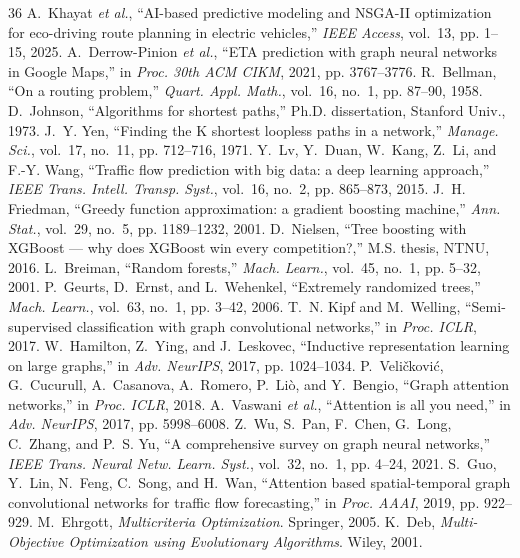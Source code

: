 \documentclass[journal]{IEEEtran}
\begin{document}
\begin{thebibliography}{36}
 A.~Khayat \emph{et al.}, ``AI-based predictive modeling and NSGA-II optimization for eco-driving route planning in electric vehicles,'' \emph{IEEE Access}, vol.~13, pp. 1--15, 2025.
 A.~Derrow-Pinion \emph{et al.}, ``ETA prediction with graph neural networks in Google Maps,'' in \emph{Proc. 30th ACM CIKM}, 2021, pp. 3767--3776.
 R.~Bellman, ``On a routing problem,'' \emph{Quart. Appl. Math.}, vol.~16, no.~1, pp. 87--90, 1958.
 D.~Johnson, ``Algorithms for shortest paths,'' Ph.D. dissertation, Stanford Univ., 1973.
 J.~Y. Yen, ``Finding the K shortest loopless paths in a network,'' \emph{Manage. Sci.}, vol.~17, no.~11, pp. 712--716, 1971.
 Y.~Lv, Y.~Duan, W.~Kang, Z.~Li, and F.-Y. Wang, ``Traffic flow prediction with big data: a deep learning approach,'' \emph{IEEE Trans. Intell. Transp. Syst.}, vol.~16, no.~2, pp. 865--873, 2015.
 J.~H. Friedman, ``Greedy function approximation: a gradient boosting machine,'' \emph{Ann. Stat.}, vol.~29, no.~5, pp. 1189--1232, 2001.
 D.~Nielsen, ``Tree boosting with XGBoost --- why does XGBoost win every competition?,'' M.S. thesis, NTNU, 2016.
 L.~Breiman, ``Random forests,'' \emph{Mach. Learn.}, vol.~45, no.~1, pp. 5--32, 2001.
 P.~Geurts, D.~Ernst, and L.~Wehenkel, ``Extremely randomized trees,'' \emph{Mach. Learn.}, vol.~63, no.~1, pp. 3--42, 2006.
 T.~N. Kipf and M.~Welling, ``Semi-supervised classification with graph convolutional networks,'' in \emph{Proc. ICLR}, 2017.
 W.~Hamilton, Z.~Ying, and J.~Leskovec, ``Inductive representation learning on large graphs,'' in \emph{Adv. NeurIPS}, 2017, pp. 1024--1034.
 P.~Veli\v{c}kovi\'{c}, G.~Cucurull, A.~Casanova, A.~Romero, P.~Li\`{o}, and Y.~Bengio, ``Graph attention networks,'' in \emph{Proc. ICLR}, 2018.
 A.~Vaswani \emph{et al.}, ``Attention is all you need,'' in \emph{Adv. NeurIPS}, 2017, pp. 5998--6008.
 Z.~Wu, S.~Pan, F.~Chen, G.~Long, C.~Zhang, and P.~S. Yu, ``A comprehensive survey on graph neural networks,'' \emph{IEEE Trans. Neural Netw. Learn. Syst.}, vol.~32, no.~1, pp. 4--24, 2021.
 S.~Guo, Y.~Lin, N.~Feng, C.~Song, and H.~Wan, ``Attention based spatial-temporal graph convolutional networks for traffic flow forecasting,'' in \emph{Proc. AAAI}, 2019, pp. 922--929.
 M.~Ehrgott, \emph{Multicriteria Optimization}. Springer, 2005.
 K.~Deb, \emph{Multi-Objective Optimization using Evolutionary Algorithms}. Wiley, 2001.

\end{thebibliography}
\end{document}
